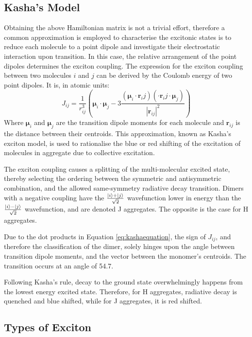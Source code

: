 \subsection{Kasha's Model}
Obtaining the above Hamiltonian matrix is not a trivial effort, therefore a common approximation is employed to characterise the excitonic states is to reduce each molecule to a point dipole and investigate their electrostatic interaction upon transition. In this case, the relative arrangement of the point dipoles determines the exciton coupling. The expression for the exciton coupling between two molecules $i$ and $j$ can be derived by the Coulomb energy of two point dipoles. It is, in atomic units:\cite{Kasha1965}
\begin{equation}
    J_{ij}=\frac{1}{r_{ij}^3}\left(\bm{\mu}_i \cdot \bm{\mu}_j - 3 \frac{(\bm{\mu}_i \cdot \bm{r}_ij)(\cdot \bm{r}_ij \cdot \bm{\mu}_j)}{|\bm{r}_{ij}|^2}\right)
    \label{eq:kashaequation}
\end{equation}
Where $\bm{\mu}_i$ and $\bm{\mu}_j$ are the transition dipole moments for each molecule and $\bm{r}_{ij}$ is the distance between their centroids. This approximation, known as Kasha's exciton model, is used to rationalise the blue or red shifting of the excitation of molecules in aggregate due to collective excitation.

The exciton coupling causes a splitting of the multi-molecular excited state, thereby selecting the ordering between the symmetric and antisymmetric combination, and the allowed same-symmetry radiative decay transition.\cite{Gierschner2016} Dimers with a negative coupling have the $\frac{\ket{i}+\ket{j}}{\sqrt{2}}$ wavefunction lower in energy than the $\frac{\ket{i}-\ket{j}}{\sqrt{2}}$ wavefunction, and are denoted J aggregates. The opposite is the case for H aggregates.

Due to the dot products in Equation \ref{eq:kashaequation}, the sign of $J_{ij}$, and therefore the classification of the dimer, solely hinges upon the angle between transition dipole moments, and the vector between the monomer's centroids. The transition occurs at an angle of 54.7\degree{}.

Following Kasha's rule, decay to the ground state overwhelmingly happens from the lowest energy excited state. Therefore, for H aggregates, radiative decay is quenched and blue shifted, while for J aggregates, it is red shifted.

\subsection{Types of Exciton}

